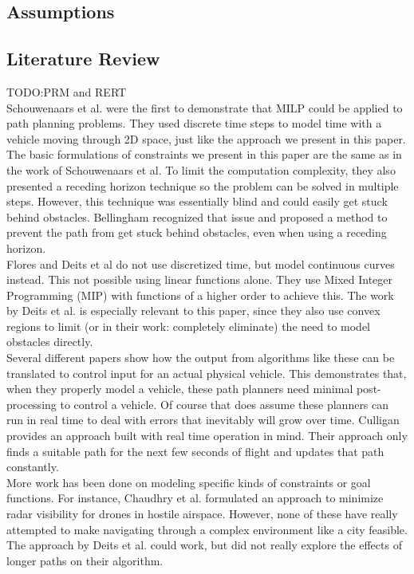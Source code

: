 \subsection{Assumptions}


\subsection{Literature Review}

TODO:PRM and RERT \\

Schouwenaars et al. \cite{Schouwenaars2001} were the first to demonstrate that MILP could be applied to path planning problems. They used discrete time steps to model time with a vehicle moving through 2D space, just like the approach we present in this paper. The basic formulations of constraints we present in this paper are the same as in the work of Schouwenaars et al. To limit the computation complexity, they also presented a receding horizon technique so the problem can be solved in multiple steps. However, this technique was essentially blind and could easily get stuck behind obstacles. Bellingham\cite{Bellingham2002} recognized that issue and proposed a method to prevent the path from get stuck behind obstacles, even when using a receding horizon. \\

Flores\cite{Flores2007} and Deits et al\cite{Deits2015} do not use discretized time, but model continuous curves instead. This not possible using linear functions alone. They use Mixed Integer Programming (MIP) with functions of a higher order to achieve this. The work by Deits et al. is especially relevant to this paper, since they also use convex regions to limit (or in their work: completely eliminate) the need to model obstacles directly. \\

Several different papers \cite{Fliess1995a, Hao2005, Cowling2007, Mellinger2011} show how the output from algorithms like these can be translated to control input for an actual physical vehicle. This demonstrates that, when they properly model a vehicle, these path planners need minimal post-processing to control a vehicle. Of course that does assume these planners can run in real time to deal with errors that inevitably will grow over time. Culligan \cite{Culligan2006} provides an approach built with real time operation in mind. Their approach only finds a suitable path for the next few seconds of flight and updates that path constantly. \\

More work has been done on modeling specific kinds of constraints or goal functions. For instance, Chaudhry et al. \cite{Chaudhry2004} formulated an approach to minimize radar visibility for drones in hostile airspace. However, none of these have really attempted to make navigating through a complex environment like a city feasible. The approach by Deits et al. \cite{Deits2015} could work, but did not really explore the effects of longer paths on their algorithm.
